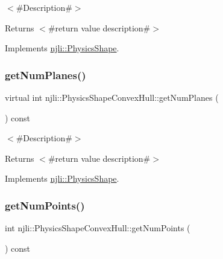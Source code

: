 $<$\#\+Description\#$>$

\begin{DoxyReturn}{Returns}
$<$\#return value description\#$>$ 
\end{DoxyReturn}


Implements \mbox{\hyperlink{classnjli_1_1_physics_shape_a24df999ba2b7ac0d9abda09c4f17c2fe}{njli\+::\+Physics\+Shape}}.

\mbox{\label{classnjli_1_1_physics_shape_convex_hull_aeff289a96116eed946c2ba7c77a9a101}} 
\subsubsection{\texorpdfstring{get\+Num\+Planes()}{getNumPlanes()}}
{\footnotesize\ttfamily virtual int njli\+::\+Physics\+Shape\+Convex\+Hull\+::get\+Num\+Planes (\begin{DoxyParamCaption}{ }\end{DoxyParamCaption}) const\hspace{0.3cm}{\ttfamily [virtual]}}

$<$\#\+Description\#$>$

\begin{DoxyReturn}{Returns}
$<$\#return value description\#$>$ 
\end{DoxyReturn}


Implements \mbox{\hyperlink{classnjli_1_1_physics_shape_a11cb80220393bfce177b8bdc34f7f359}{njli\+::\+Physics\+Shape}}.

\mbox{\label{classnjli_1_1_physics_shape_convex_hull_a1dffedec65f0094774fdee81709f6123}} 
\subsubsection{\texorpdfstring{get\+Num\+Points()}{getNumPoints()}}
{\footnotesize\ttfamily int njli\+::\+Physics\+Shape\+Convex\+Hull\+::get\+Num\+Points (\begin{DoxyParamCaption}{ }\end{DoxyParamCaption}) const}


